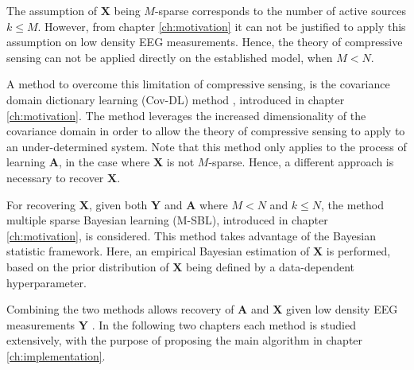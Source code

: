 The assumption of $\mathbf{X}$ being $M$-sparse corresponds to the number of active sources $k \leq M$. 
However, from chapter \ref{ch:motivation} it can not be justified to apply this assumption on low density EEG measurements. 
Hence, the theory of compressive sensing can not be applied directly on the established model, when $M < N$. 

A method to overcome this limitation of compressive sensing, is the covariance domain dictionary learning (Cov-DL) method \cite{Balkan2015}, introduced in chapter \ref{ch:motivation}.
The method leverages the increased dimensionality of the covariance domain in order to allow the theory of compressive sensing to apply to an under-determined system. 
Note that this method only applies to the process of learning $\mathbf{A}$, in the case where $\textbf{X}$ is not $M$-sparse. 
Hence, a different approach is necessary to recover $\mathbf{X}$.

For recovering $\mathbf{X}$, given both $\mathbf{Y}$ and $\mathbf{A}$ where $M < N$ and $k \leq N$, the method multiple sparse Bayesian learning (M-SBL)\cite{Balkan2014}, introduced in chapter \ref{ch:motivation}, is considered.
This method takes advantage of the Bayesian statistic framework. 
Here, an empirical Bayesian estimation of $\mathbf{X}$ is performed, based on the prior distribution of $\mathbf{X}$ being defined by a data-dependent hyperparameter.  

Combining the two methods allows recovery of $\mathbf{A}$ and $\mathbf{X}$ given low density EEG measurements $\mathbf{Y}$ \cite{phd2015}. 
In the following two chapters each method is studied extensively, with the purpose of proposing the main algorithm in chapter \ref{ch:implementation}. 





